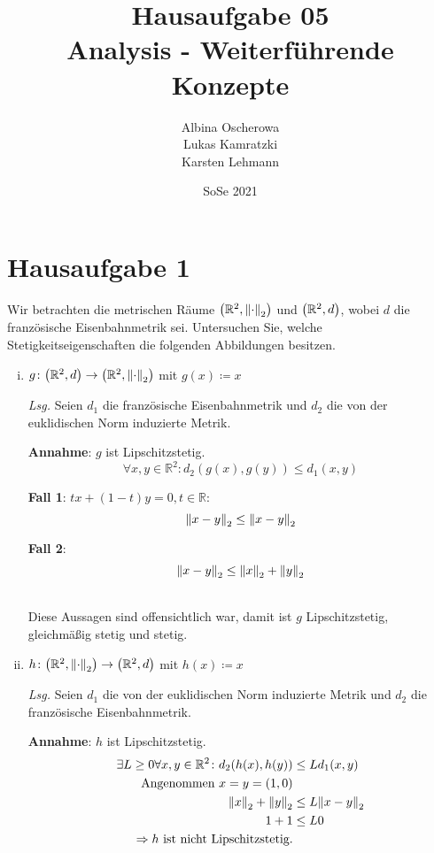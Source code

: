 \documentclass{scrreprt}
\author{Albina Oscherowa \\ Lukas Kamratzki \\ Karsten Lehmann}
\date{SoSe 2021}
\title{Hausaufgabe 05 \\Analysis - Weiterführende Konzepte}
\begin{document}
\section*{Hausaufgabe 1}

Wir betrachten die metrischen Räume $\qty(\mathbb{R}^2, \norm{\cdot}_2)$ und
$\qty(\mathbb{R}^2, d)$, wobei $d$ die französische Eisenbahnmetrik sei.
Untersuchen Sie, welche Stetigkeitseigenschaften die folgenden Abbildungen
besitzen. \\
\begin{enumerate}[(i)]
\item $g \colon \qty(\mathbb{R}^2, d) \to \qty(\mathbb{R}^2, \norm{\cdot}_2)$
  mit $g(x) \coloneqq x$

  \textit{Lsg.} Seien $d_1$ die französische Eisenbahnmetrik und $d_2$ die von
  der euklidischen Norm induzierte Metrik.

  \textbf{Annahme}: $g$ ist Lipschitzstetig.
  \[
    \forall x, y \in \mathbb{R}^2 \colon d_2(g(x), g(y)) \leq d_1(x, y)
  \]
  \begin{minipage}[t]{.45\textwidth}
    \textbf{Fall 1}: $tx + (1 - t)y = 0, t \in \mathbb{R}$:
    \[
      \norm{x - y}_2 \leq \norm{x - y}_2
    \]
  \end{minipage}
  \vrule
  \hfill
  \begin{minipage}[t]{.45\textwidth}
    \textbf{Fall 2}:
    \[
      \norm{x - y}_2 \leq \norm{x}_2 + \norm{y}_2
    \]
  \end{minipage} \\

  Diese Aussagen sind offensichtlich war, damit ist $g$ Lipschitzstetig,
  gleichmäßig stetig und stetig.

\item $h \colon \qty(\mathbb{R}^2, \norm{\cdot}_2) \to \qty(\mathbb{R}^2, d)$
  mit $h(x) \coloneqq x$

  \textit{Lsg.} Seien $d_1$ die von der euklidischen Norm induzierte Metrik und
  $d_2$ die französische Eisenbahnmetrik.

  \textbf{Annahme}: $h$ ist Lipschitzstetig.
  \begin{align*}
    \exists L \geq 0 \forall x, y \in \mathbb{R}^2 \colon d_2(h(x), h(y)) &\leq L d_1(x, y) \\
    \text{Angenommen $x = y = (1, 0)$} \\
    \norm{x}_2 + \norm{y}_2 &\leq L \norm{x - y}_2 \\
    1 + 1 &\leq L 0 \\
    \Rightarrow h \text{ ist nicht Lipschitzstetig.}
  \end{align*}


\end{enumerate}
\end{document}

